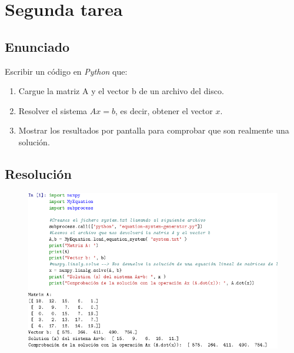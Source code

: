 \documentclass[12pt,twoside]{article}
\begin{document}
\section{Segunda tarea}

\subsection{Enunciado}

Escribir un código en \textit{Python} que:

\begin{enumerate}

\item Cargue la matriz A y el vector b de un archivo del disco.

\item Resolver el sistema $Ax=b$, es decir, obtener el vector $x$.

\item Mostrar los resultados por pantalla para comprobar que son realmente una solución.

\end{enumerate}

\subsection{Resolución}

\begin{figure}[hbt]
	\includegraphics[width=1\textwidth]{task2.png}
\end{figure}
\end{document}
